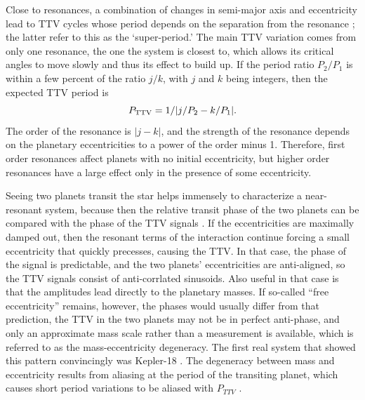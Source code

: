 \documentclass[graybox,natbib,nosecnum]{svmult}
\begin{document}
Close to resonances, a combination of changes in semi-major axis and eccentricity lead to TTV cycles whose period depends on the separation from the resonance \citep{Steffen2006,2012ApJ...761..122L}; the latter refer to this as the `super-period.'  The main TTV variation comes from only one resonance, the one the system is closest to, which allows its critical angles to move slowly and thus its effect to build up.  If the period ratio $P_2/P_1$ is within a few percent of the ratio $j/k$, with $j$ and $k$ being integers, then the expected TTV period is 
\begin{equation}
P_{\rm TTV} = 1/|j/P_2-k/P_1|. \label{eqn:pttv}
\end{equation}
The order of the resonance is $|j-k|$, and the strength of the resonance depends on the planetary eccentricities to a power of the order minus 1.  Therefore, first order resonances affect planets with no initial eccentricity, but higher order resonances have a large effect only in the presence of some eccentricity. 

Seeing two planets transit the star helps immensely to characterize a near-resonant system, because then the relative transit phase of the two planets can be compared with the phase of the TTV signals \citep{2012ApJ...761..122L}.  If the eccentricities are maximally damped out, then the resonant terms of the interaction continue forcing a small eccentricity that quickly precesses, causing the TTV.  In that case, the phase of the signal is predictable, and the two planets' eccentricities are anti-aligned, so the TTV signals consist of anti-corrlated sinusoids.  Also useful in that case is that the amplitudes lead directly to the planetary masses.  If so-called ``free eccentricity'' remains, however, the phases would usually differ from that prediction, the TTV in the two planets may not be in perfect anti-phase, and only an approximate mass scale rather than a measurement is available, which is referred to as the mass-eccentricity degeneracy.  The first real system that showed this pattern convincingly was Kepler-18 \citep{2011ApJS..197....7C}. %
The degeneracy between mass and eccentricity results from aliasing at the period of the transiting planet, which causes short period variations to be aliased with $P_{TTV}$ \citep{2012ApJ...761..122L,2015ApJ...802..116D}.  
\end{document}
